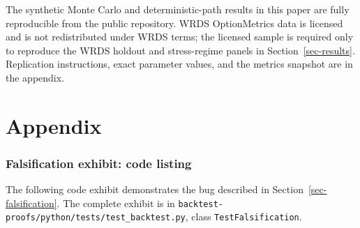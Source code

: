 \documentclass[
  11pt,
  letterpaper,
  DIV=12,
  numbers=noendperiod]{scrartcl}
\numberwithin{equation}{section}
\numberwithin{figure}{section}
\numberwithin{table}{section}
\let\quantproofsoldsection\section
\renewcommand{\section}{\clearpage\quantproofsoldsection}
\begin{document}
The synthetic Monte Carlo and deterministic-path results in this paper
are fully reproducible from the public repository. WRDS OptionMetrics
data is licensed and is not redistributed under WRDS terms; the licensed
sample is required only to reproduce the WRDS holdout and stress-regime
panels in Section~\ref{sec-results}. Replication instructions, exact
parameter values, and the metrics snapshot are in the appendix.

\clearpage
\appendix
\part*{Appendix}

\section{Falsification exhibit: code
listing}\label{sec-appendix-falsification}

The following code exhibit demonstrates the bug described in
Section~\ref{sec-falsification}. The complete exhibit is in
\texttt{backtest-proofs/python/tests/test\_backtest.py}, class
\texttt{TestFalsification}.
\end{document}
